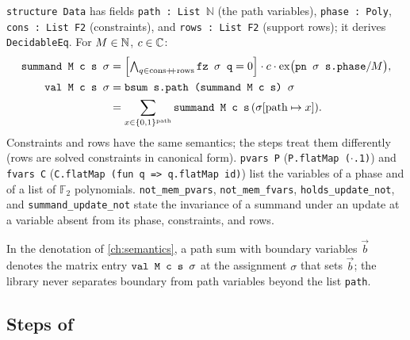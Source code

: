 \begin{definition}\label{def:lean-pathsum-data}
\textnormal{\texttt{structure Data}} has fields \textnormal{\texttt{path : List \ensuremath{\mathbb{N}}}} (the path variables), \textnormal{\texttt{phase : Poly}},
\textnormal{\texttt{cons : List F2}} (constraints), and \textnormal{\texttt{rows : List F2}} (support rows); it derives
\textnormal{\texttt{DecidableEq}}. For $M\in\mathbb{N}$, $c\in\mathbb{C}$:
\begin{align*}
\textnormal{\texttt{summand M c s \ensuremath{\sigma}}} &= \Bigl[\textstyle\bigwedge_{q\in \text{cons}\mathbin{+\!\!+}\text{rows}} \textnormal{\texttt{fz \ensuremath{\sigma} q}} = 0\Bigr]\cdot c\cdot\operatorname{ex}\bigl(\textnormal{\texttt{pn \ensuremath{\sigma} s.\allowbreak{}phase}}/M\bigr),\\
\textnormal{\texttt{val M c s \ensuremath{\sigma}}} &= \textnormal{\texttt{bsum s.\allowbreak{}path (\allowbreak{}summand M c s) \ensuremath{\sigma}}}\\
  &= \sum_{x\in\{0,1\}^{\text{path}}}\textnormal{\texttt{summand M c s}}\,(\sigma[\text{path}\mapsto x]).
\end{align*}
Constraints and rows have the same semantics; the steps treat them differently (rows are
solved constraints in canonical form). \textnormal{\texttt{pvars P}} (\textnormal{\texttt{P.\allowbreak{}flatMap (\allowbreak{}\ensuremath{\cdot}.\allowbreak{}1)}}) and
\textnormal{\texttt{fvars C}} (\textnormal{\texttt{C.\allowbreak{}flatMap (\allowbreak{}fun q => q.\allowbreak{}flatMap id)}}) list the variables of a phase and of a
list of $\mathbb F_2$ polynomials. \textnormal{\texttt{not\_\allowbreak{}mem\_\allowbreak{}pvars}}, \textnormal{\texttt{not\_\allowbreak{}mem\_\allowbreak{}fvars}},
\textnormal{\texttt{holds\_\allowbreak{}update\_\allowbreak{}not}}, and \textnormal{\texttt{summand\_\allowbreak{}update\_\allowbreak{}not}} state the invariance of a summand under an
update at a variable absent from its phase, constraints, and rows.
\end{definition}

\noindent In the denotation of \cref{ch:semantics}, a path sum with boundary variables $\vec b$
denotes the matrix entry $\textnormal{\texttt{val M c s \ensuremath{\sigma}}}$ at the assignment $\sigma$ that sets $\vec b$; the
library never separates boundary from path variables beyond the list \textnormal{\texttt{path}}.

\subsection{Steps of \texorpdfstring{}{PathSumSem}}

